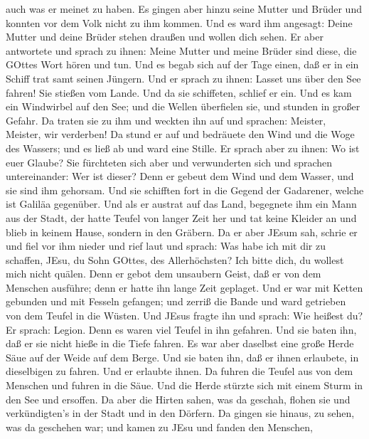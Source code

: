auch was er meinet zu haben.  Es gingen aber hinzu seine
Mutter und Brüder und konnten vor dem Volk nicht zu ihm kommen.
 Und es ward ihm angesagt: Deine Mutter und deine Brüder
stehen draußen und wollen dich sehen.  Er aber antwortete
und sprach zu ihnen: Meine Mutter und meine Brüder sind diese, die
GOttes Wort hören und tun.  Und es begab sich auf der Tage
einen, daß er in ein Schiff trat samt seinen Jüngern. Und er sprach zu
ihnen: Lasset uns über den See fahren! Sie stießen vom Lande.
 Und da sie schiffeten, schlief er ein. Und es kam ein
Windwirbel auf den See; und die Wellen überfielen sie, und stunden in
großer Gefahr.  Da traten sie zu ihm und weckten ihn auf
und sprachen: Meister, Meister, wir verderben! Da stund er auf und
bedräuete den Wind und die Woge des Wassers; und es ließ ab und ward
eine Stille.  Er sprach aber zu ihnen: Wo ist euer Glaube?
Sie fürchteten sich aber und verwunderten sich und sprachen
untereinander: Wer ist dieser? Denn er gebeut dem Wind und dem Wasser,
und sie sind ihm gehorsam.  Und sie schifften fort in die
Gegend der Gadarener, welche ist Galiläa gegenüber.  Und
als er austrat auf das Land, begegnete ihm ein Mann aus der Stadt, der
hatte Teufel von langer Zeit her und tat keine Kleider an und blieb in
keinem Hause, sondern in den Gräbern.  Da er aber JEsum
sah, schrie er und fiel vor ihm nieder und rief laut und sprach: Was
habe ich mit dir zu schaffen, JEsu, du Sohn GOttes, des Allerhöchsten?
Ich bitte dich, du wollest mich nicht quälen.  Denn er
gebot dem unsaubern Geist, daß er von dem Menschen ausführe; denn er
hatte ihn lange Zeit geplaget. Und er war mit Ketten gebunden und mit
Fesseln gefangen; und zerriß die Bande und ward getrieben von dem Teufel
in die Wüsten.  Und JEsus fragte ihn und sprach: Wie
heißest du? Er sprach: Legion. Denn es waren viel Teufel in ihn
gefahren.  Und sie baten ihn, daß er sie nicht hieße in die
Tiefe fahren.  Es war aber daselbst eine große Herde Säue
auf der Weide auf dem Berge. Und sie baten ihn, daß er ihnen erlaubete,
in dieselbigen zu fahren. Und er erlaubte ihnen.  Da fuhren
die Teufel aus von dem Menschen und fuhren in die Säue. Und die Herde
stürzte sich mit einem Sturm in den See und ersoffen.  Da
aber die Hirten sahen, was da geschah, flohen sie und verkündigten's in
der Stadt und in den Dörfern.  Da gingen sie hinaus, zu
sehen, was da geschehen war; und kamen zu JEsu und fanden den Menschen,
